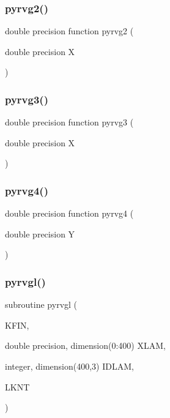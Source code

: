 \subsubsection{\texorpdfstring{pyrvg2()}{pyrvg2()}}
{\footnotesize\ttfamily double precision function pyrvg2 (\begin{DoxyParamCaption}\item[{double precision}]{X }\end{DoxyParamCaption})}

\mbox{\label{pythia-6_84_824_8f_a23fb42dd91c099fbcd5cd2001c74e98d}} 
\subsubsection{\texorpdfstring{pyrvg3()}{pyrvg3()}}
{\footnotesize\ttfamily double precision function pyrvg3 (\begin{DoxyParamCaption}\item[{double precision}]{X }\end{DoxyParamCaption})}

\mbox{\label{pythia-6_84_824_8f_a4de5cb4846e35b7378ff15e9a97710c4}} 
\subsubsection{\texorpdfstring{pyrvg4()}{pyrvg4()}}
{\footnotesize\ttfamily double precision function pyrvg4 (\begin{DoxyParamCaption}\item[{double precision}]{Y }\end{DoxyParamCaption})}

\mbox{\label{pythia-6_84_824_8f_a9cc390826ed9a3821e2295bf3cfa3ccd}} 
\subsubsection{\texorpdfstring{pyrvgl()}{pyrvgl()}}
{\footnotesize\ttfamily subroutine pyrvgl (\begin{DoxyParamCaption}\item[{}]{K\+F\+IN,  }\item[{double precision, dimension(0\+:400)}]{X\+L\+AM,  }\item[{integer, dimension(400,3)}]{I\+D\+L\+AM,  }\item[{}]{L\+K\+NT }\end{DoxyParamCaption})}

